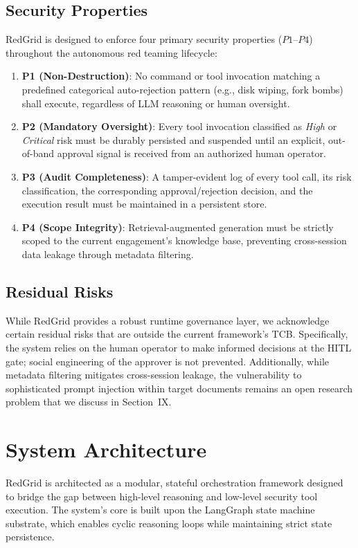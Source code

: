 \documentclass[conference,compsoc]{IEEEtran}
\begin{document}
\subsection{Security Properties}
RedGrid is designed to enforce four primary security properties ($P1$--$P4$) throughout the autonomous red teaming lifecycle:

\begin{enumerate}
    \item \textbf{P1 (Non-Destruction)}: No command or tool invocation matching a predefined categorical auto-rejection pattern (e.g., disk wiping, fork bombs) shall execute, regardless of LLM reasoning or human oversight.
    \item \textbf{P2 (Mandatory Oversight)}: Every tool invocation classified as \textit{High} or \textit{Critical} risk must be durably persisted and suspended until an explicit, out-of-band approval signal is received from an authorized human operator.
    \item \textbf{P3 (Audit Completeness)}: A tamper-evident log of every tool call, its risk classification, the corresponding approval/rejection decision, and the execution result must be maintained in a persistent store.
    \item \textbf{P4 (Scope Integrity)}: Retrieval-augmented generation must be strictly scoped to the current engagement's knowledge base, preventing cross-session data leakage through metadata filtering.
\end{enumerate}

\subsection{Residual Risks}
While RedGrid provides a robust runtime governance layer, we acknowledge certain residual risks that are outside the current framework's TCB. Specifically, the system relies on the human operator to make informed decisions at the HITL gate; social engineering of the approver is not prevented. Additionally, while metadata filtering mitigates cross-session leakage, the vulnerability to sophisticated prompt injection within target documents remains an open research problem that we discuss in Section~IX.

\section{System Architecture} \label{sec:arch}
RedGrid is architected as a modular, stateful orchestration framework designed to bridge the gap between high-level reasoning and low-level security tool execution. The system's core is built upon the LangGraph state machine substrate, which enables cyclic reasoning loops while maintaining strict state persistence.
\end{document}
